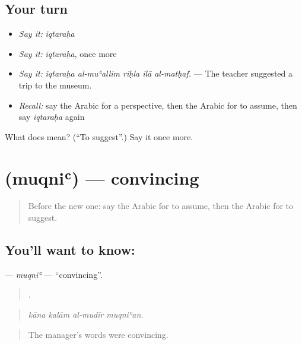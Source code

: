 \subsection*{Your turn}
\begin{itemize}
\raggedright
  \item \emph{Say it:} \emph{iqtaraḥa}
  \item \emph{Say it:} \emph{iqtaraḥa}, once more
  \item \emph{Say it:} \emph{iqtaraḥa al-muʿallim riḥla ilā al-matḥaf.} — The teacher suggested a trip to the museum.
  \item \emph{Recall:} say the Arabic for a perspective, then the Arabic for to assume, then say \emph{iqtaraḥa} again
\end{itemize}

\begin{tcolorbox}[breakable,colback=teal!4,colframe=teal!35!black,title={Before you move on}]
What does  mean? (\textquotedblleft{}To suggest\textquotedblright{}.) Say it once more.
\end{tcolorbox}
\section[\texorpdfstring{\ar{مقنع} (muqniʿ)}{مقنع (muqniʿ)}]{ (muqniʿ) — convincing}

\label{lesson:AR-C359-muqni}



\begin{quote}
Before the new one: say the Arabic for to assume, then the Arabic for to suggest.
\end{quote}

\subsection*{You'll want to know: }
\textbf{} — \emph{muqniʿ} — \textquotedblleft{}convincing\textquotedblright{}.

\begin{quote}
   .
\end{quote}

\begin{quote}
\emph{kāna kalām al-mudīr muqniʿan.}
\end{quote}

\begin{quote}
The manager's words were convincing.
\end{quote}

